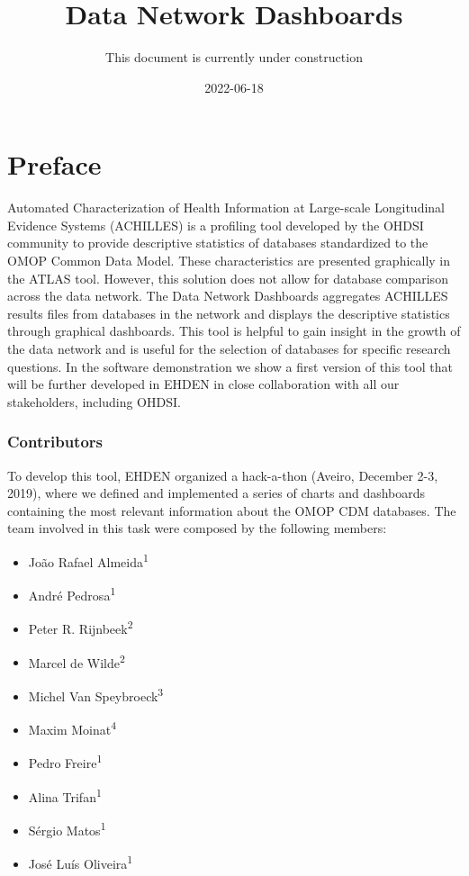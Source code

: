 \documentclass[
]{book}
\title{Data Network Dashboards}
\author{This document is currently under construction}
\date{2022-06-18}
\providecommand{\tightlist}{%
  \setlength{\itemsep}{0pt}\setlength{\parskip}{0pt}}
\begin{document}
\maketitle

{
\setcounter{tocdepth}{1}
\tableofcontents
}
\hypertarget{preface}{%
\chapter{Preface}\label{preface}}

Automated Characterization of Health Information at Large-scale Longitudinal Evidence Systems (ACHILLES) is a profiling tool developed by the OHDSI community to provide descriptive statistics of databases standardized to the OMOP Common Data Model. These characteristics are presented graphically in the ATLAS tool. However, this solution does not allow for database comparison across the data network. The Data Network Dashboards aggregates ACHILLES results files from databases in the network and displays the descriptive statistics through graphical dashboards. This tool is helpful to gain insight in the growth of the data network and is useful for the selection of databases for specific research questions. In the software demonstration we show a first version of this tool that will be further developed in EHDEN in close collaboration with all our stakeholders, including OHDSI.

\hypertarget{contributors}{%
\subsection*{Contributors}\label{contributors}}

To develop this tool, EHDEN organized a hack-a-thon (Aveiro, December 2-3, 2019), where we defined and implemented a series of charts and dashboards containing the most relevant information about the OMOP CDM databases. The team involved in this task were composed by the following members:

\begin{itemize}
\tightlist
\item
  João Rafael Almeida\textsuperscript{1}
\item
  André Pedrosa\textsuperscript{1}
\item
  Peter R. Rijnbeek\textsuperscript{2}
\item
  Marcel de Wilde\textsuperscript{2}
\item
  Michel Van Speybroeck\textsuperscript{3}
\item
  Maxim Moinat\textsuperscript{4}
\item
  Pedro Freire\textsuperscript{1}
\item
  Alina Trifan\textsuperscript{1}
\item
  Sérgio Matos\textsuperscript{1}
\item
  José Luís Oliveira\textsuperscript{1}
\end{itemize}
\end{document}
